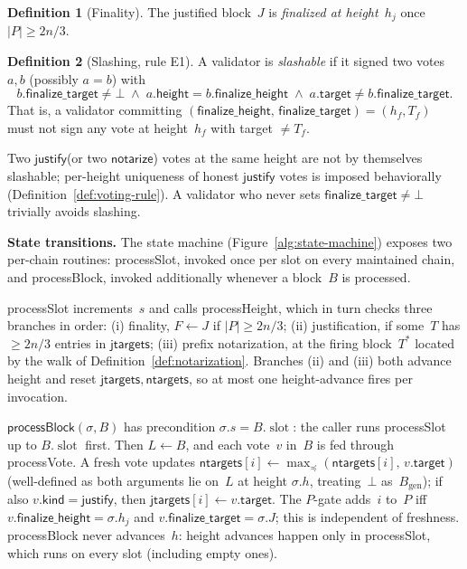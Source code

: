 \ifx\litemode\undefined\documentclass{article}\fi
\newcommand{\genesis}{\ensuremath{B_{\mathrm{gen}}}}
\newcommand{\slot}[0]{\ensuremath{\operatorname{\mathrm{slot}}}}
\newcommand{\target}{\mathsf{target}}
\newcommand{\kind}{\mathsf{kind}}
\newcommand{\height}{\mathsf{height}}
\newcommand{\just}{\ensuremath{\mathsf{justify}}\xspace}
\newcommand{\notar}{\ensuremath{\mathsf{notarize}}\xspace}
\newcommand{\finalizeHeight}{\mathsf{finalize\_height}}
\newcommand{\finalizeTarget}{\mathsf{finalize\_target}}
\newcommand{\jtargets}{\mathsf{jtargets}}
\newcommand{\ntargets}{\mathsf{ntargets}}
\newcommand{\processSlot}{\textsf{processSlot}\xspace}
\newcommand{\processBlock}{\textsf{processBlock}\xspace}
\newcommand{\processHeight}{\textsf{processHeight}\xspace}
\newcommand{\processVote}{\textsf{processVote}\xspace}
\renewcommand{\paragraph}[1]{\vspace{7pt}\noindent\textbf{#1}}
\theoremstyle{plain}
\theoremstyle{definition}
\newtheorem{definition}{Definition}
\theoremstyle{remark}
\begin{document}
\begin{definition}[Finality]\label{def:finality}
The justified block~$J$ is \emph{finalized at height~$h_j$} once $|P| \geq 2n/3$.
\end{definition}

\begin{definition}[Slashing, rule E1]\label{def:slashing}
A validator is \emph{slashable} if it signed two votes~$a, b$ (possibly $a = b$) with
\[
  b.\finalizeTarget \neq \bot \;\wedge\; a.\height = b.\finalizeHeight \;\wedge\; a.\target \neq b.\finalizeTarget.
\]
That is, a validator committing $(\finalizeHeight,\, \finalizeTarget) = (h_f, T_f)$ must not sign any vote at height~$h_f$ with target $\neq T_f$.
\end{definition}

Two \just (or two \notar) votes at the same height are not by themselves slashable; per-height uniqueness of honest \just votes is imposed behaviorally (Definition~\ref{def:voting-rule}).
A validator who never sets $\finalizeTarget \neq \bot$ trivially avoids slashing.

\paragraph{State transitions.}
The state machine (Figure~\ref{alg:state-machine}) exposes two per-chain routines: \processSlot, invoked once per slot on every maintained chain, and \processBlock, invoked additionally whenever a block~$B$ is processed.

\processSlot increments~$s$ and calls \processHeight, which in turn checks three branches in order: (i) finality, $F \gets J$ if $|P| \geq 2n/3$; (ii) justification, if some~$T$ has $\geq 2n/3$ entries in $\jtargets$; (iii) prefix notarization, at the firing block~$T^*$ located by the walk of Definition~\ref{def:notarization}.
Branches (ii) and (iii) both advance height and reset $\jtargets, \ntargets$, so at most one height-advance fires per invocation.

$\processBlock(\sigma, B)$ has precondition $\sigma.s = B.\slot$: the caller runs \processSlot up to $B.\slot$ first.
Then $L \gets B$, and each vote~$v$ in~$B$ is fed through \processVote.
A fresh vote updates $\ntargets[i] \gets \max_{\preceq}(\ntargets[i],\, v.\target)$ (well-defined as both arguments lie on~$L$ at height $\sigma.h$, treating~$\bot$ as~$\genesis$); if also $v.\kind = \just$, then $\jtargets[i] \gets v.\target$.
The $P$-gate adds~$i$ to~$P$ iff $v.\finalizeHeight = \sigma.h_j$ and $v.\finalizeTarget = \sigma.J$; this is independent of freshness.
\processBlock never advances~$h$: height advances happen only in \processSlot, which runs on every slot (including empty ones).
\end{document}
